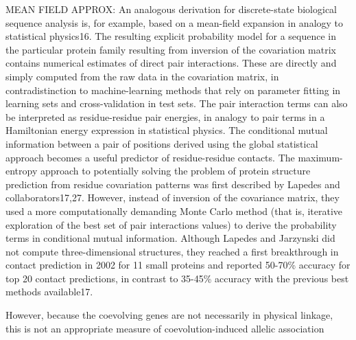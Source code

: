 	MEAN FIELD APPROX: An analogous derivation for discrete-state biological sequence analysis is, for example, based on a mean-field expansion in analogy to statistical physics16. The resulting explicit probability model for a sequence in the particular protein family resulting from inversion of the covariation matrix contains numerical estimates of direct pair interactions. These are directly and simply computed from the raw data in the covariation matrix, in contradistinction to machine-learning methods that rely on parameter fitting in learning sets and cross-validation in test sets. The pair interaction terms can also be interpreted as residue-residue pair energies, in analogy to pair terms in a Hamiltonian energy expression in statistical physics. The conditional mutual information between a pair of positions derived using the global statistical approach becomes a useful predictor of residue-residue contacts. \cite{marks2012protein}
	The maximum-entropy approach to potentially solving the problem of protein structure prediction from residue covariation patterns was first described by Lapedes and collaborators17,27. However, instead of inversion of the covariance matrix, they used a more computationally demanding Monte Carlo method (that is, iterative exploration of the best set of pair interactions values) to derive the probability terms in conditional mutual information. Although Lapedes and Jarzynski did not compute three-dimensional structures, they reached a first breakthrough in contact prediction in 2002 for 11 small proteins and reported 50-70\% accuracy for top 20 contact predictions, in contrast to 35-45\% accuracy with the previous best methods available17. \cite{marks2012protein}

However, because the coevolving genes are not necessarily in physical linkage, this is not an appropriate measure of coevolution-induced allelic association \cite{rohlfs2010detecting}


